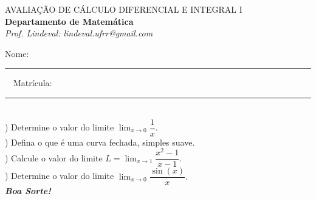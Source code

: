 \documentclass[12pt,a4paper]{article}
\begin{document}
\begin{center}
\large AVALIAÇÃO DE CÁLCULO DIFERENCIAL E INTEGRAL I\\
{\large\bf Departamento de Matemática}\\[1mm] \textit{Prof. Lindeval: lindeval.ufrr@gmail.com}\\\end{center}

\noindent Nome: \rule{9cm}{0.3mm}\ \ Matrícula: \rule{3.5cm}{0.3mm}\\[1cm]
) Determine o valor do limite $\lim_{x\to 0}\dfrac{1}{x}.$\\
) Defina o que é uma  curva fechada, simples suave.\\
) Calcule o valor do limite $L=\lim_{x\to 1}\dfrac{x^2-1}{x-1}.$\\
) Determine o valor do limite $\lim_{x\to 0}\dfrac{\sin(x)}{x}.$\\
\vfill\hfill\bf{\textit{Boa Sorte!}}
\end{document}

